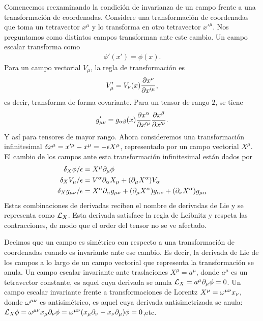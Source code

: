 Comencemos reexaminando la condición de invarianza de un campo frente a una transformación de coordenadas. Considere una transformación de coordenadas que toma un tetravector $x^\mu$ y lo transforma en otro tetravector $x'^\mu$. Nos preguntamos como distintos campos transforman ante este cambio. Un campo escalar transforma como
\begin{align}
	\phi'(x') = \phi(x).
\end{align}
Para un campo vectorial $V_\mu$, la regla de transformación es 
\begin{align}
	V_\mu' = V_\nu(x)\frac{\partial x^\nu}{\partial x'^\mu},
\end{align}
es decir, transforma de forma covariante. Para un tensor de rango $2$, se tiene
\begin{align}
	g_{\mu\nu}' = g_{\alpha\beta}(x)\frac{\partial x^\alpha}{\partial x'^\mu}\frac{\partial x^\beta}{\partial x'^\nu}.
\end{align}
Y así para tensores de mayor rango. Ahora consideremos una transformación infinitesimal $\delta x^\mu=x'^\mu-x^\mu=-\epsilon X^\mu$, representado por un campo vectorial $X^\mu$. El cambio de los campos ante esta transformación infinitesimal están dados por
\begin{align}
	\delta_X\phi/\epsilon &= X^\mu\partial_\mu\phi\\
	\delta_XV_\mu/\epsilon &= V^\alpha\partial_\alpha X_\mu+(\partial_\mu X^\alpha)V_\alpha \label{eq:4.3.0.5} \\
	\delta_X g_{\mu\nu}/\epsilon &= X^\alpha\partial_\alpha g_{\mu\nu}+(\partial_\mu X^\alpha)g_{\alpha\nu}+(\partial_\nu X^\alpha)g_{\mu\alpha}
\end{align}
Estas combinaciones de derivadas reciben el nombre de derivadas de Lie y se representa como $\mathcal{L}_X$. Esta derivada satisface la regla de Leibnitz y respeta las contracciones, de modo que el order del tensor no se ve afectado.

Decimos que un campo es simétrico con respecto a una transformación de coordenadas cuando es invariante ante ese cambio. Es decir, la derivada de Lie de los campos a lo largo de un campo vectorial que representa la transformación se anula. Un campo escalar invariante ante traslaciones $X^\mu=a^\mu$, donde $a^\mu$ es un tetravector constante, es aquel cuya derivada se anula $\mathcal{L}_X = a^\mu\partial_\mu\phi=0$. Un campo escalar invariante frente a transformaciones de Lorentz $X^\mu=\omega^{\mu\nu}x_\nu$, donde $\omega^{\mu\nu}$ es antisimétrico, es aquel cuya derivada antisimetrizada se anula: $\mathcal{L}_X\phi=\omega^{\mu\nu}x_\mu\partial_\nu\phi=\omega^{\mu\nu}(x_\mu\partial_\nu-x_\nu\partial_\mu)\phi=0$,etc.

